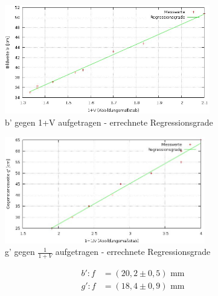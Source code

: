 \begin{figure}[H]
\includegraphics[width=0.8\textwidth]{pics/abbe1.jpg}
\caption{b' gegen 1+V aufgetragen - errechnete Regressionsgrade}
\end{figure}

\begin{figure}[H]
\includegraphics[width=0.78\textwidth]{pics/abbe2.jpg}
\caption{g' gegen $\frac{1}{1+V}$ aufgetragen - errechnete Regressionsgrade}
\end{figure}


\begin{align*}
b': f&=(20,2  \pm 0,5) \text{ mm}\\
g': f&=(18,4  \pm 0,9) \text{ mm}
\end{align*}

